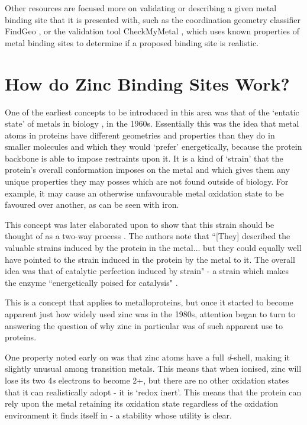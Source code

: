 Other resources are focused more on validating or describing a given metal binding site that it is presented with, such as the coordination geometry classifier FindGeo \cite{andreini2012findgeo}, or the validation tool CheckMyMetal \cite{zheng2017checkmymetal}, which uses known properties of metal binding sites to determine if a proposed binding site is realistic.

\section{How do Zinc Binding Sites Work?}

One of the earliest concepts to be introduced in this area was that of the `entatic state' of metals in biology \cite{vallee1968metalloenzymes}, in the 1960s. Essentially this was the idea that metal atoms in proteins have different geometries and properties than they do in smaller molecules and which they would `prefer' energetically, because the protein backbone is able to impose restraints upon it. It is a kind of `strain' that the protein's overall conformation imposes on the metal and which gives them any unique properties they may posses which are not found outside of biology. For example, it may cause an otherwise unfavourable metal oxidation state to be favoured over another, as can be seen with iron.

This concept was later elaborated upon to show that this strain should be thought of as a two-way process \cite{williams1985symbiosis}. The authors note that ``[They] described the valuable strains induced by the protein in the metal... but they could equally well have pointed to the strain induced in the protein by the metal to it. The overall idea was that of catalytic perfection induced by strain" - a strain which makes the enzyme ``energetically poised for catalysis" \cite{vallee1984metallobiochemistry}.

This is a concept that applies to metalloproteins, but once it started to become apparent just how widely used zinc was in the 1980s, attention began to turn to answering the question of why zinc in particular was of such apparent use to proteins.

One property noted early on \cite{vallee1984metallobiochemistry} was that zinc atoms have a full \textit{d}-shell, making it slightly unusual among transition metals. This means that when ionised, zinc will lose its two 4\textit{s} electrons to become 2+, but there are no other oxidation states that it can realistically adopt - it is `redox inert'. This means that the protein can rely upon the metal retaining its oxidation state regardless of the oxidation environment it finds itself in - a stability whose utility is clear.

